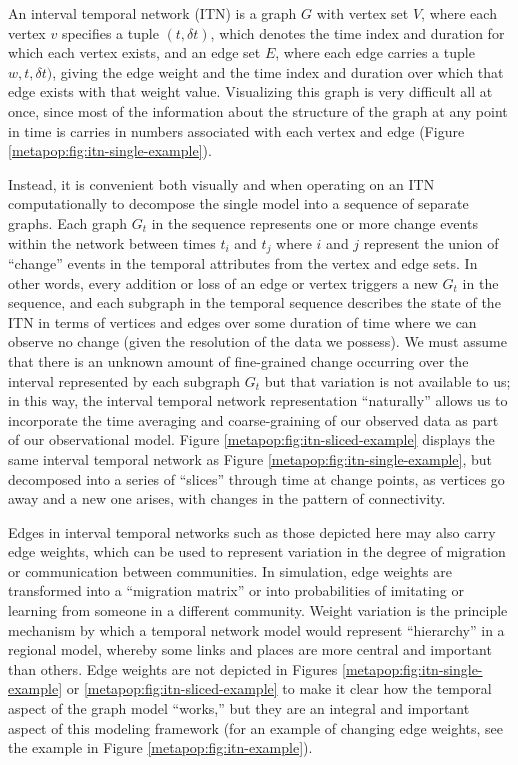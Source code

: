     An interval temporal network (ITN) is a graph \(G\) with vertex set \(V\), where each vertex \(v\) specifies a tuple \((t, \delta t)\), which denotes the time index and duration for which each vertex exists, and an edge set \(E\), where each edge carries a tuple \(w, t, \delta t)\), giving the edge weight and the time index and duration over which that edge exists with that weight value.  Visualizing this graph is very difficult all at once, since most of the information about the structure of the graph at any point in time is carries in numbers associated with each vertex and edge (Figure \ref{metapop:fig:itn-single-example}).  
    
    Instead, it is convenient both visually and when operating on an ITN computationally to decompose the single model into a sequence of separate graphs.  Each graph \(G_t\) in the sequence represents one
    or more change events within the network between times \(t_i\) and
    \(t_j\) where \(i\) and \(j\) represent the union of ``change'' events in the temporal attributes from the vertex and edge sets.  In other words, every addition or loss of an edge or vertex triggers a new \(G_t\) in the sequence, and each subgraph in the temporal sequence describes the state of the ITN in terms of vertices and edges over some duration of time where we can observe no change (given the resolution of the data we possess).  We must assume that there is an unknown amount of fine-grained change occurring over the interval represented by each subgraph \(G_t\) but that variation is not available to us; in this way, the interval temporal network representation ``naturally'' allows us to incorporate the time averaging and coarse-graining of our observed data as part of our observational model.  Figure \ref{metapop:fig:itn-sliced-example} displays the same interval temporal network as Figure \ref{metapop:fig:itn-single-example}, but decomposed into a series of ``slices'' through time at change points, as vertices go away and a new one arises, with changes in the pattern of connectivity.

    Edges in interval temporal networks such as those depicted here may also carry edge weights, which can be used to represent variation in the degree of migration or communication between communities.  In simulation, edge weights are transformed into a ``migration matrix'' or into probabilities of imitating or learning from someone in a different community.  Weight variation is the principle mechanism by which a temporal network model would represent ``hierarchy'' in a regional model, whereby some links and places are more central and important than others.  Edge weights are not depicted in Figures \ref{metapop:fig:itn-single-example} or \ref{metapop:fig:itn-sliced-example} to make it clear how the temporal aspect of the graph model ``works,'' but they are an integral and important aspect of this modeling framework (for an example of changing edge weights, see the example in Figure \ref{metapop:fig:itn-example}).  
    

